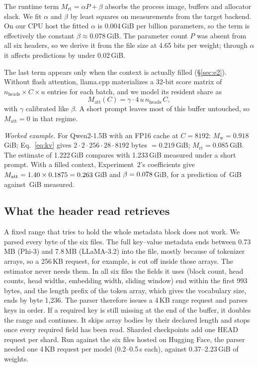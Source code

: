\documentclass[conference]{IEEEtran}
\begin{document}
The runtime term $M_{\mathrm{rt}} = \alpha P + \beta$ absorbs the process image, buffers and allocator slack. We fit $\alpha$ and $\beta$ by least squares on measurements from the target backend. On our CPU host the fitted $\alpha$ is 0.004\,GiB per billion parameters, so the term is effectively the constant $\beta \approx 0.078$\,GiB. The parameter count $P$ was absent from all six headers, so we derive it from the file size at 4.65 bits per weight; through $\alpha$ it affects predictions by under 0.02\,GiB.

The last term appears only when the context is actually filled (\S\ref{sec:e2}). Without flash attention, llama.cpp materializes a 32-bit score matrix of $n_{\mathrm{heads}} \times C \times u$ entries for each batch, and we model its resident share as
\begin{equation}
M_{\mathrm{att}}(C) = \gamma \cdot 4\, u\, n_{\mathrm{heads}}\, C,
\label{eq:att}
\end{equation}
with $\gamma$ calibrated like $\beta$. A short prompt leaves most of this buffer untouched, so $M_{\mathrm{att}} = 0$ in that regime.

\textit{Worked example.} For Qwen2-1.5B with an FP16 cache at $C = 8192$: $M_{\mathrm{w}} = 0.918$\,GiB; Eq.~\eqref{eq:kv} gives $2 \cdot 2 \cdot 256 \cdot 28 \cdot 8192$ bytes $= 0.219$\,GiB; $M_{\mathrm{rt}} = 0.085$\,GiB. The estimate of 1.222\,GiB compares with 1.233\,GiB measured under a short prompt. With a filled context, Experiment~2's coefficients give $M_{\mathrm{att}} = 1.40 \times 0.1875 = 0.263$\,GiB and $\beta = 0.078$\,GiB, for a prediction of \QwenFilledPred\,GiB against \QwenFilledMeas\,GiB measured.

\subsection{What the header read retrieves}
A fixed range that tries to hold the whole metadata block does not work. We parsed every byte of the six files. The full key--value metadata ends between 0.73\,MB (Phi-3) and 7.8\,MB (LLaMA-3.2) into the file, mostly because of tokenizer arrays, so a 256\,KB request, for example, is cut off inside those arrays. The estimator never needs them. In all six files the fields it uses (block count, head counts, head widths, embedding width, sliding window) end within the first 993 bytes, and the length prefix of the token array, which gives the vocabulary size, ends by byte 1{,}236. The parser therefore issues a 4\,KB range request and parses keys in order. If a required key is still missing at the end of the buffer, it doubles the range and continues. It skips array bodies by their declared length and stops once every required field has been read. Sharded checkpoints add one HEAD request per shard. Run against the six files hosted on Hugging Face, the parser needed one 4\,KB request per model (0.2--0.5\,s each), against 0.37--2.23\,GiB of weights.
\end{document}
